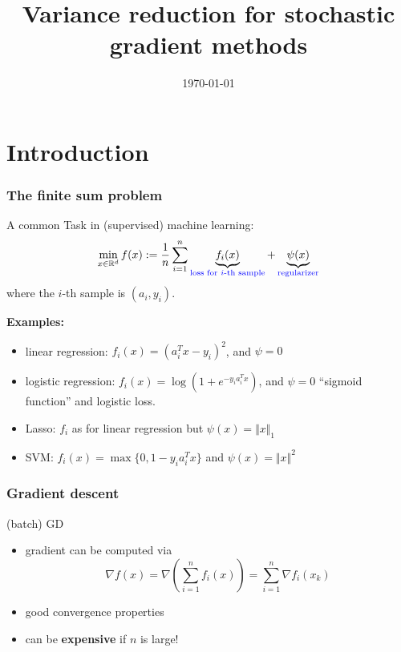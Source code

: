 \documentclass[aspectratio=149]{beamer}
\title{Variance reduction for stochastic gradient methods}
\date{\today}
\begin{document}
\maketitle
\frame{\tableofcontents}


\section{Introduction}%

\begin{frame}
  \frametitle{The finite sum problem}
  A common Task in (supervised) machine learning:
  \begin{equation}
    \min_{x\in \mathbb{R}^d} f(x) := \frac{1}{n} \sum_{i=1}^{n} \underbrace{f_i(x)}_{\textcolor{blue}{\text{loss for $i$-th sample}}} + \underbrace{\psi(x)}_{\textcolor{blue}{\text{regularizer}}}
  \end{equation}
  where the $i$-th sample is $(a_i, y_i)$.

  \textbf{Examples:}
  \begin{itemize}
    \item linear regression: $f_i(x) = {(a_i^T x -y_i)}^2$, and $\psi=0$
    \item logistic regression: $f_i(x) = \log(1+e^{-y_i a_i^T x})$, and $\psi=0$
          ``sigmoid function'' and logistic loss.
    \item Lasso: $f_i$ as for linear regression but $\psi(x) = \Vert x \Vert_1$
    \item SVM: $f_i(x) = \max \{0 , 1 - y_i a_i^T x\}$ and $\psi(x)= \Vert x \Vert^2$
  \end{itemize}
\end{frame}

\begin{frame}
  \frametitle{Gradient descent}
  \begin{algorithm}[H]
    \caption{(batch) GD}
    \begin{algorithmic}[1]
      \EndFor{}
    \end{algorithmic}
  \end{algorithm}

  \begin{itemize}
    \item gradient can be computed via
          \begin{equation}
            \nabla f(x) = \nabla \left(\sum_{i=1}^{n}f_i(x)\right) = \sum_{i=1}^{n} \nabla f_i(x_k)
          \end{equation}
    \item good convergence properties
    \item can be \textbf{expensive} if $n$ is large!
  \end{itemize}
\end{frame}
\end{document}
